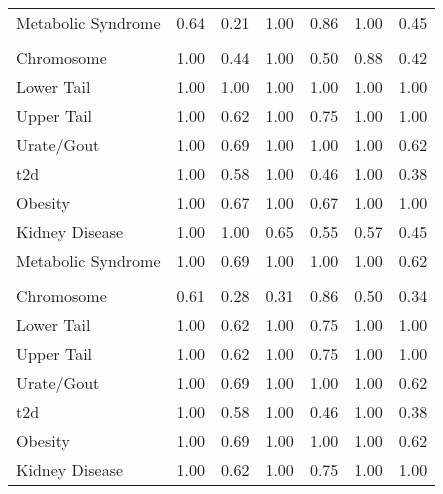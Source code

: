 \documentclass[]{report}
\begin{document}
\begin{table}
\begin{tabular}[t]{lllllll}
\hspace{1em}Metabolic Syndrome & 0.64 & 0.21 & 1.00 & 0.86 & 1.00 & 0.45\\
\addlinespace[0.3em]
\multicolumn{7}{l}{\textbf{Fay and Wu's H}}\\
\hspace{1em}Chromosome & 1.00 & 0.44 & 1.00 & 0.50 & 0.88 & 0.42\\
\hspace{1em}Lower Tail & 1.00 & 1.00 & 1.00 & 1.00 & 1.00 & 1.00\\
\hspace{1em}Upper Tail & 1.00 & 0.62 & 1.00 & 0.75 & 1.00 & \vphantom{2} 1.00\\
\hspace{1em}Urate/Gout & 1.00 & 0.69 & 1.00 & 1.00 & 1.00 & \vphantom{2} 0.62\\
\hspace{1em}\Gls{t2d} & 1.00 & 0.58 & 1.00 & 0.46 & 1.00 & \vphantom{1} 0.38\\
\hspace{1em}Obesity & 1.00 & 0.67 & 1.00 & 0.67 & 1.00 & 1.00\\
\hspace{1em}Kidney Disease & 1.00 & 1.00 & 0.65 & 0.55 & 0.57 & 0.45\\
\hspace{1em}Metabolic Syndrome & 1.00 & 0.69 & 1.00 & 1.00 & 1.00 & \vphantom{2} 0.62\\
\addlinespace[0.3em]
\multicolumn{7}{l}{\textbf{Tajima's D}}\\
\hspace{1em}Chromosome & 0.61 & 0.28 & 0.31 & 0.86 & 0.50 & 0.34\\
\hspace{1em}Lower Tail & 1.00 & 0.62 & 1.00 & 0.75 & 1.00 & \vphantom{1} 1.00\\
\hspace{1em}Upper Tail & 1.00 & 0.62 & 1.00 & 0.75 & 1.00 & \vphantom{1} 1.00\\
\hspace{1em}Urate/Gout & 1.00 & 0.69 & 1.00 & 1.00 & 1.00 & \vphantom{1} 0.62\\
\hspace{1em}\Gls{t2d} & 1.00 & 0.58 & 1.00 & 0.46 & 1.00 & 0.38\\
\hspace{1em}Obesity & 1.00 & 0.69 & 1.00 & 1.00 & 1.00 & 0.62\\
\hspace{1em}Kidney Disease & 1.00 & 0.62 & 1.00 & 0.75 & 1.00 & 1.00\\

\end{tabular}
\end{table}
\end{document}
